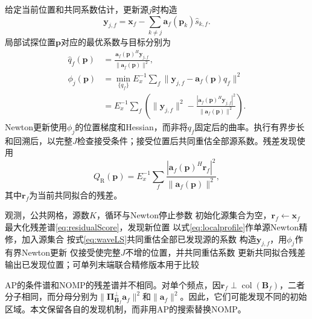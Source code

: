 给定当前位置和共同系数估计，更新源$j$时构造
\begin{equation}
 \bm y_{j,f}=\bm x_f-\sum_{k\ne j}\bm a_f(\bm p_k)\widehat s_{k,f} .
 \label{eq:targetResidual}
\end{equation}
局部试探位置$\bm p$对应的最优系数与目标分别为
\begin{align}
 \widehat q_f(\bm p)&=\frac{\bm a_f(\bm p)^H\bm y_{j,f}}
 {\|\bm a_f(\bm p)\|^2},\label{eq:localcoef}\\
 \phi_j(\bm p)&=\min_{\{q_f\}}E_x^{-1}\sum_f
 \|\bm y_{j,f}-\bm a_f(\bm p)q_f\|^2\nonumber\\
 &=E_x^{-1}\sum_f\left(\|\bm y_{j,f}\|^2-
 \frac{|\bm a_f(\bm p)^H\bm y_{j,f}|^2}{\|\bm a_f(\bm p)\|^2}\right).
 \label{eq:localprofile}
\end{align}
Newton更新使用$\phi_j$的位置梯度和Hessian，而非将$q_f$固定后的曲率。执行有界步长和回溯后，以完整$J$检查接受条件；接受位置后共同重估全部源系数。残差发现使用
\begin{equation}
 Q_{\mathrm R}(\bm p)=E_x^{-1}\sum_f
 \frac{|\bm a_f(\bm p)^H\bm r_f|^2}{\|\bm a_f(\bm p)\|^2},
 \label{eq:residualScore}
\end{equation}
其中$\bm r_f$为当前共同拟合的残差。

\begin{algorithm}[H]
\caption{波形消元块NOMP}\label{alg:nomp}
\begin{algorithmic}[1]
\Require 观测，公共网格，源数$K$，循环与Newton停止参数
\State 初始化源集合为空，$\bm r_f\gets\bm x_f$
  \State 最大化残差谱\eqref{eq:residualScore}，发现新位置
  \State 以式\eqref{eq:localprofile}作单源Newton精修，加入源集合
  \State 按式\eqref{eq:waveLS}共同重估全部已发现源的系数
  \Repeat
      \State 构造$\bm y_{j,f}$，用$\phi_j$作有界Newton更新
      \State 仅接受使完整$J$不增的位置，并共同重估系数
    \EndFor
  \State 更新共同拟合残差
\EndFor
\State 输出已发现位置；可单列末端联合精修版本用于比较
\end{algorithmic}
\end{algorithm}

AP的条件谱和NOMP的残差谱并不相同。对单个频点，因$\bm r_f\perp\operatorname{col}(\bm B_f)$，二者分子相同，而分母分别为$\|\bm\Pi_{\bm B_f}^{\perp}\bm a_f\|^2$和$\|\bm a_f\|^2$。因此，它们可能发现不同的初始区域。本文保留各自的发现机制，而非用AP的搜索替换NOMP。

